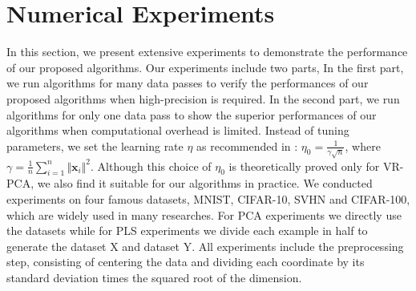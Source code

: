 \documentclass[runningheads,a4paper]{llncs}
\begin{document}
 
 
 \section{Numerical Experiments}
 \label{experiments}
 In this section, we present extensive experiments to demonstrate the performance of our proposed algorithms. Our experiments include two parts, 
 In the first part, we run algorithms for many data passes to verify the performances of our proposed algorithms when high-precision is required.
 In the second part, we run algorithms for only one data pass to show the superior performances of our algorithms when computational overhead is limited. Instead of tuning parameters, we set the learning rate $\eta$ as recommended in \citep{Shamir2015A}: $\eta_0 = \frac{1}{\gamma\sqrt{n}}$, where $\gamma = \frac{1}{n}\sum\limits_{i=1}^{n}{\Vert \mathbf{x}_i\Vert}^2$. Although this choice of $\eta_0$ is theoretically proved only for VR-PCA, we also find it suitable for our algorithms in practice.
We conducted experiments on four famous datasets, MNIST, CIFAR-10, SVHN and CIFAR-100, which are widely used in many researches. For PCA experiments we directly use the datasets while for PLS experiments we divide each example in half to generate the dataset X and dataset Y.
 All experiments include the preprocessing step, consisting of centering the data and dividing each coordinate by its standard deviation times the squared root of the dimension. 
 
\end{document}
